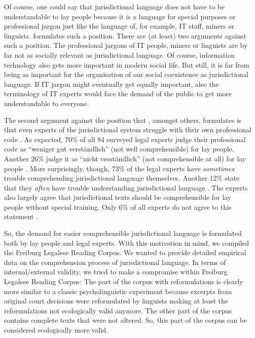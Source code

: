\documentclass[output=paper]{langsci/langscibook}
\begin{document}
Of course, one could say that jurisdictional language does not have to be understandable to lay people because it is a language for special purposes or professional jargon just like the language of, for example, IT staff, miners or linguists. \citet{Towfigh2009} formulates such a position. There are (at least) two arguments against such a position. The professional jargons of IT people, miners or linguists are by far not as socially relevant as jurisdictional language. Of course, information technology also gets more important in modern social life. But still, it is far from being as important for the organisation of our social coexistence as jurisdictional language. If IT jargon might eventually get equally important, also the terminology of IT experts would face the demand of the public to get more understandable to everyone.

\newpage 
The second argument against the position that \citet{Towfigh2009}, amongst others, formulates is that even experts of the jurisdictional system struggle with their own professional code \citep[cf. ][]{eichhoff2009einstellungen}. As expected, 70\% of all 84 surveyed legal experts judge their professional code as ``weniger gut verständlich'' (not well comprehensible) for lay people. Another 26\% judge it as ``nicht verständlich'' (not comprehensible at all) for lay people \citep[138]{eichhoff2009einstellungen}. More surprisingly, though, 73\% of the legal experts have \textit{sometimes} trouble comprehending jurisdictional language themselves. Another 12\% state that they \textit{often} have trouble understanding jurisdictional language \citep[146]{eichhoff2009einstellungen}. The experts also largely agree that jurisdictional texts should be comprehensible for lay people without special training. Only 6\% of all experts do not agree to this statement \citep[139]{eichhoff2009einstellungen}.

So, the demand for easier comprehensible jurisdictional language is formulated both by lay people and legal experts. With this motivation in mind, we compiled the Freiburg Legalese Reading Corpus. We wanted to provide detailed empirical data on the comprehension process of jurisdictional language. In terms of internal/external validity, we tried to make a compromise within Freiburg Legalese Reading Corpus: The part of the corpus with reformulations is clearly more similar to a classic psycholinguistic experiment because excerpts from original court decisions were reformulated by linguists making at least the reformulations not ecologically valid anymore. The other part of the corpus contains complete texts that were not altered. So, this part of the corpus can be considered ecologically more valid.
\end{document}
